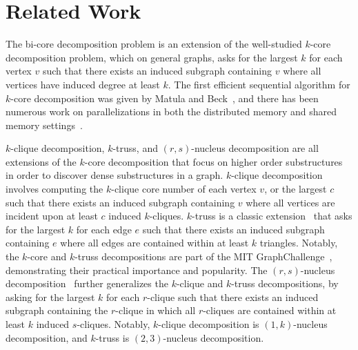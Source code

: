 \section{Related Work}

 The bi-core decomposition problem is an extension of the well-studied $k$-core decomposition problem, which on general graphs, asks for the largest $k$ for each vertex $v$ such that there exists an induced subgraph containing $v$ where all vertices have induced degree at least $k$. The first efficient sequential algorithm for $k$-core decomposition was given by Matula and Beck~\cite{MaBe83}, and there has been numerous work on parallelizations in both the distributed memory and shared memory settings~\cite{Dasari2014,Kabir2017,MonDe13,TriHoh18,DhBlSh17}.


$k$-clique decomposition, $k$-truss, and $(r, s)$-nucleus decomposition are all extensions of the $k$-core decomposition that focus on higher order substructures in order to discover dense substructures in a graph. $k$-clique decomposition~\cite{Tsour15,shi2020parallel} involves computing the $k$-clique core number of each vertex $v$, or the largest $c$ such that there exists an induced subgraph containing $v$ where all vertices are incident upon at least $c$ induced $k$-cliques.
$k$-truss is a classic extension~\cite{Cohen08,ZhaoTung12,ZhangPar12,WangCheng12,KaMad17,SarSe18,AlmAn19} that asks for the largest $k$ for each edge $e$ such that there exists an induced subgraph containing $e$ where all edges are contained within at least $k$ triangles. Notably, the $k$-core and $k$-truss decompositions are part of the MIT GraphChallenge~\cite{GraphChallenge}, demonstrating their practical importance and popularity. The $(r, s)$-nucleus decomposition~\cite{SarErd15, SarErd17} further generalizes the $k$-clique and $k$-truss decompositions, by asking for the largest $k$ for each $r$-clique such that there exists an induced subgraph containing the $r$-clique in which all $r$-cliques are contained within at least $k$ induced $s$-cliques. Notably, $k$-clique decomposition is $(1, k)$-nucleus decomposition, and $k$-truss is $(2, 3)$-nucleus decomposition.

